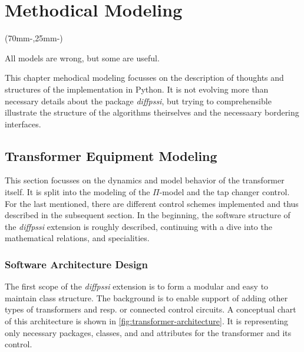 
\chapter{Methodical Modeling}
\label{chap:methodical-modeling}

\begin{textblock*}{.7\textwidth}(70mm-\offset,25mm-\offset)
        \begin{fquote}
            All models are wrong, but some are useful.
        \end{fquote}
\end{textblock*}

This chapter mehodical modeling focusses on the description of thoughts and structures of the implementation in Python.
It is not evolving more than necessary details about the package {\itshape diffpssi}, but trying to comprehensible illustrate the structure of the algorithms theirselves and the necessaary bordering interfaces.

\section{Transformer Equipment Modeling}
\label{sec:transformer-modeling}

This section focusses on the dynamics and model behavior of the transformer itself.
It is split into the modeling of the $\Pi$-model and the tap changer control.
For the last mentioned, there are different control schemes implemented and thus described in the subsequent section.
In the beginning, the software structure of the \textit{diffpssi} extension is roughly described, continuing with a dive into the mathematical relations, and specialities.  

\subsection{Software Architecture Design}
\label{sec:modeling-architecture}

The first scope of the \textit{diffpssi} extension is to form a modular and easy to maintain class structure. 
The background is to enable support of adding other types of transformers and resp. or connected control circuits.
A conceptual chart of this architecture is shown in \autoref{fig:transformer-architecture}.
It is representing only necessary packages, classes, and and attributes for the transformer and its control.

